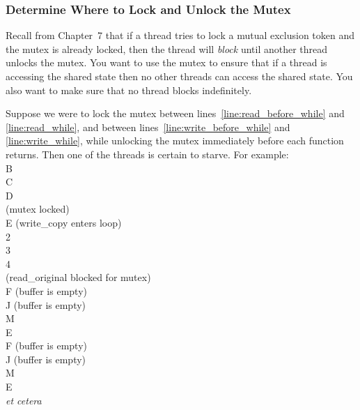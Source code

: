     \subsubsection{Determine Where to Lock and Unlock the Mutex} \label{subsubsec:designMutex}

    Recall from Chapter~7 that if a thread tries to lock a mutual exclusion token and the mutex is already locked, then the thread will \textit{block} until another thread unlocks the mutex.
    You want to use the mutex to ensure that if a thread is accessing the shared state then no other threads can access the shared state.
    You also want to make sure that no thread blocks indefinitely.

    Suppose we were to lock the mutex between lines~\ref{line:read_before_while} and \ref{line:read_while}, and between lines~\ref{line:write_before_while} and \ref{line:write_while}, while unlocking the mutex immediately before each function returns.
    Then one of the threads is certain to starve.
    For example: \\ {\footnotesize
    \phantom{foobarbaz} B \\
    \phantom{foobarbaz} C \\
    \phantom{foobarbaz} D \\
    \phantom{foobarbaz} (mutex locked) \\
    \phantom{foobarbaz} E   (write\_copy enters loop) \\
    2 \\
    3 \\
    4 \\
    (read\_original blocked for mutex) \\
    \phantom{foobarbaz} F   (buffer is empty) \\
    \phantom{foobarbaz} J   (buffer is empty) \\
    \phantom{foobarbaz} M \\
    \phantom{foobarbaz} E \\
    \phantom{foobarbaz} F   (buffer is empty) \\
    \phantom{foobarbaz} J   (buffer is empty) \\
    \phantom{foobarbaz} M \\
    \phantom{foobarbaz} E \\
    \phantom{foobarbaz} \textit{et cetera}
    }
    \vspace{1cm}

